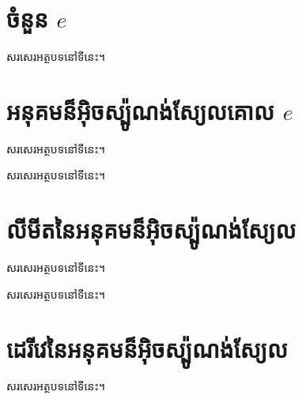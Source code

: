 \documentclass[8pt,a4paper,twocolumn]{book}
\begin{document}
	\section{ចំនួន $ e $}
	\begin{definition}{}{}
		សរសេរអត្ថបទនៅទីនេះ។
	\end{definition}
	\section{អនុគមន៏អ៊ិចស្ប៉ូណង់ស្យែលគោល $ e $}
	\begin{definition}{}{}
		សរសេរអត្ថបទនៅទីនេះ។
	\end{definition}
	\begin{property}{}{}
		សរសេរអត្ថបទនៅទីនេះ។
	\end{property}
	\section{លីមីតនៃអនុគមន៏អ៊ិចស្ប៉ូណង់ស្យែល}
	\begin{theorem}{}{}
		សរសេរអត្ថបទនៅទីនេះ។
	\end{theorem}
	\begin{property}{}{}
		សរសេរអត្ថបទនៅទីនេះ។
	\end{property}
	\section{ដេរីវេនៃអនុគមន៏អ៊ិចស្ប៉ូណង់ស្យែល}
	\begin{property}{}{}
		សរសេរអត្ថបទនៅទីនេះ។
	\end{property}
\end{document}
